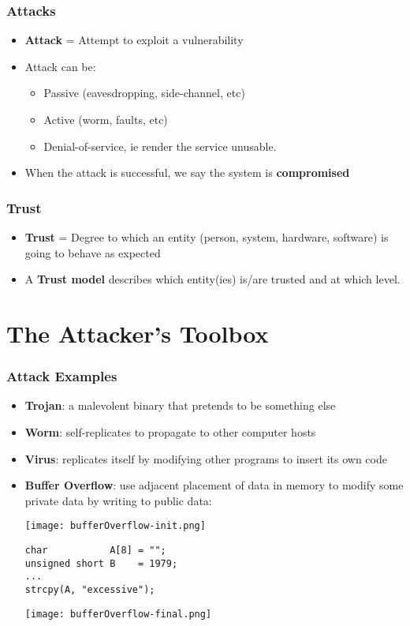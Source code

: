 \documentclass[
hyperref={pdfpagelabels=false}
,xcolor=table
]
{beamer}
\begin{document}
\begin{frame}
  \frametitle{Attacks}
  \begin{itemize}
  \item \textbf{Attack} = Attempt to exploit a vulnerability
  \item Attack can be:
    \begin{itemize}
    \item Passive (eavesdropping, side-channel, etc)
    \item Active (worm, faults, etc)
    \item Denial-of-service, ie render the service unusable. 
    \end{itemize}
  \item When the attack is successful, we say the system is \textbf{compromised} 
  \end{itemize}
\end{frame}


\begin{frame}
  \frametitle{Trust}
  \begin{itemize}
  \item \textbf{Trust} = Degree to which an entity (person, system, hardware, software) is going to behave as expected
  \item A \textbf{Trust model} describes which entity(ies) is/are
    trusted and at which level.
  \end{itemize}
\end{frame}

\section{The Attacker's Toolbox}


\begin{frame}[fragile]
  \frametitle{Attack Examples}
  \begin{itemize}
  \item \textbf{Trojan}: a malevolent binary that pretends to be something else
  \item \textbf{Worm}: self-replicates to propagate to other computer hosts
  \item \textbf{Virus}: replicates itself by modifying other programs to insert its own code
  \item \textbf{Buffer Overflow}: use adjacent placement of data in memory to modify some private data by writing to public data:
    \begin{center}
      \texttt{[image: bufferOverflow-init.png]}
\begin{verbatim}
char           A[8] = "";
unsigned short B    = 1979;
...
strcpy(A, "excessive");
\end{verbatim}
      \texttt{[image: bufferOverflow-final.png]}
    \end{center}
  \end{itemize}
\end{frame}
\end{document}
